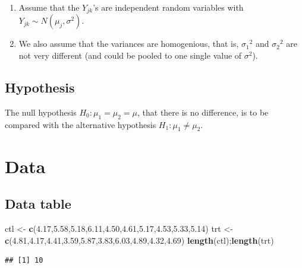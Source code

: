 \documentclass[
]{book}
\newenvironment{Shaded}{\begin{snugshade}}{\end{snugshade}}
\newcommand{\FloatTok}[1]{\textcolor[rgb]{0.00,0.00,0.81}{#1}}
\newcommand{\KeywordTok}[1]{\textcolor[rgb]{0.13,0.29,0.53}{\textbf{#1}}}
\newcommand{\NormalTok}[1]{#1}
\newcommand{\StringTok}[1]{\textcolor[rgb]{0.31,0.60,0.02}{#1}}
\providecommand{\tightlist}{%
  \setlength{\itemsep}{0pt}\setlength{\parskip}{0pt}}
\begin{document}
\begin{enumerate}
\def\labelenumi{\arabic{enumi}.}
\tightlist
\item
  Assume that the \(Y_{jk}\)'s are independent random variables with \(Y_{jk} \sim N(\mu_j , \sigma^2)\).
\item
  We also assume that the variances are homogenious, that is, \({\sigma_1}^2\) and \({\sigma_2}^2\) are not very different (and could be pooled to one single value of \(\sigma^2\)).
\end{enumerate}

\hypertarget{hypothesis}{%
\subsection{Hypothesis}\label{hypothesis}}

The null hypothesis \(H_0 : \mu_1 = \mu_2 = \mu\), that there is no difference, is to be compared with the alternative hypothesis \(H_1 : \mu_1 \ne \mu_2\).

\hypertarget{data}{%
\section{Data}\label{data}}

\hypertarget{data-table}{%
\subsection{Data table}\label{data-table}}

\begin{Shaded}
\begin{Highlighting}[]
\NormalTok{ctl <-}\StringTok{ }\KeywordTok{c}\NormalTok{(}\FloatTok{4.17}\NormalTok{,}\FloatTok{5.58}\NormalTok{,}\FloatTok{5.18}\NormalTok{,}\FloatTok{6.11}\NormalTok{,}\FloatTok{4.50}\NormalTok{,}\FloatTok{4.61}\NormalTok{,}\FloatTok{5.17}\NormalTok{,}\FloatTok{4.53}\NormalTok{,}\FloatTok{5.33}\NormalTok{,}\FloatTok{5.14}\NormalTok{)}
\NormalTok{trt <-}\StringTok{ }\KeywordTok{c}\NormalTok{(}\FloatTok{4.81}\NormalTok{,}\FloatTok{4.17}\NormalTok{,}\FloatTok{4.41}\NormalTok{,}\FloatTok{3.59}\NormalTok{,}\FloatTok{5.87}\NormalTok{,}\FloatTok{3.83}\NormalTok{,}\FloatTok{6.03}\NormalTok{,}\FloatTok{4.89}\NormalTok{,}\FloatTok{4.32}\NormalTok{,}\FloatTok{4.69}\NormalTok{)}
\KeywordTok{length}\NormalTok{(ctl);}\KeywordTok{length}\NormalTok{(trt)}
\end{Highlighting}
\end{Shaded}

\begin{verbatim}
## [1] 10
\end{verbatim}
\end{document}
